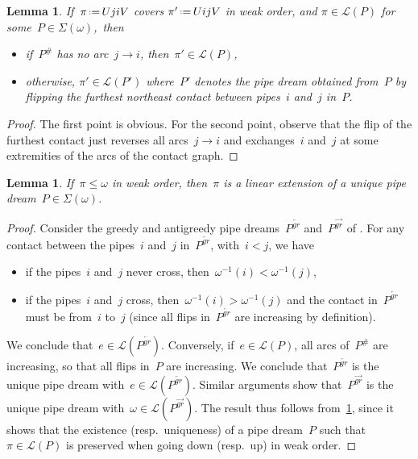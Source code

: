 \documentclass{amsart}
\newtheorem{lemma}[theorem]{Lemma}
\theoremstyle{definition}
\newcommand{\eqdef}{\mbox{\,\raisebox{0.2ex}{\scriptsize\ensuremath{\mathrm:}}\ensuremath{=}\,}} %
\newcommand{\contact}{^\#} %
\newcommand{\acyclicPipeDreams}{\Sigma} %
\newcommand{\linearExtensions}{\mathcal{L}} %
\newcommand{\greedyPipeDream}{P^{\overleftarrow{gr}}} %
\newcommand{\antiGreedyPipeDream}{P^{\overrightarrow{gr}}} %
\begin{document}
\begin{lemma}
\label{lem:lowerSetPipeDreams}
If~$\pi \eqdef UjiV$ covers $\pi' \eqdef UijV$ in weak order, and ${\pi \in \linearExtensions(P)}$ for some~${P \in \acyclicPipeDreams(\omega)}$,~then
\begin{itemize}
\item if~$P\contact$ has no arc~$j \to i$, then~$\pi' \in \linearExtensions(P)$,
\item otherwise, $\pi' \in \linearExtensions(P')$ where~$P'$ denotes the pipe dream obtained from~$P$ by flipping the furthest northeast contact between pipes~$i$ and~$j$ in~$P$.
\end{itemize}
\end{lemma}

\begin{proof}
The first point is obvious.
For the second point, observe that the flip of the furthest contact just reverses all arcs~$j \to i$ and exchanges~$i$ and~$j$ at some extremities of the arcs of the contact graph.
\end{proof}

\begin{lemma}
\label{lem:partition}
If~$\pi \le \omega$ in weak order, then~$\pi$ is a linear extension of a unique pipe dream~$P \in \acyclicPipeDreams(\omega)$.
\end{lemma}

\begin{proof}
Consider the greedy and antigreedy pipe dreams~$\greedyPipeDream$ and~$\antiGreedyPipeDream$ of \cite{PilaudPocchiola}.
For any contact between the pipes~$i$ and~$j$ in~$\greedyPipeDream$, with~$i < j$, we have
\begin{itemize}
\item if the pipes~$i$ and~$j$ never cross, then~$\omega^{-1}(i) < \omega^{-1}(j)$,
\item if the pipes~$i$ and~$j$ cross, then~$\omega^{-1}(i) > \omega^{-1}(j)$ and the contact in~$\greedyPipeDream$ must be from~$i$ to~$j$ (since all flips in~$\greedyPipeDream$ are increasing by definition).
\end{itemize}
We conclude that~$e \in \linearExtensions(\greedyPipeDream)$.
Conversely, if~$e \in \linearExtensions(P)$, all arcs of~$P\contact$ are increasing, so that all flips in~$P$ are increasing.
We conclude that~$\greedyPipeDream$ is the unique pipe dream with~$e \in \linearExtensions(\greedyPipeDream)$.
Similar arguments show that~$\antiGreedyPipeDream$ is the unique pipe dream with~$\omega \in \linearExtensions(\antiGreedyPipeDream)$.
The result thus follows from~\cref{lem:lowerSetPipeDreams}, since it shows that the existence (resp.~uniqueness) of a pipe dream~$P$ such that~$\pi \in \linearExtensions(P)$ is preserved when going down (resp.~up) in weak order.
\end{proof}
\end{document}
